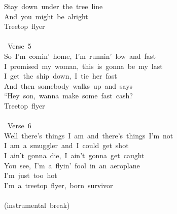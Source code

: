 {Stay\ down\ under\ the\ tree\ line\\
And\ you\ might\ be\ alright\\
Treetop\ flyer\\
\\
\lbrack\ Verse\ 5\rbrack\\
So\ I'm\ comin'\ home,\ I'm\ runnin'\ low\ and\ fast\\
I\ promised\ my\ woman,\ this\ is\ gonna\ be\ my\ last\\
I\ get\ the\ ship\ down,\ I\ tie\ her\ fast\\
And\ then\ somebody\ walks\ up\ and\ says\\
``Hey\ son,\ wanna\ make\ some\ fast\ cash?\;\\
Treetop\ flyer\\
\\
\lbrack\ Verse\ 6\rbrack\\
Well\ there's\ things\ I\ am\ and\ there's\ things\ I'm\ not\\
I\ am\ a\ smuggler\ and\ I\ could\ get\ shot\\
I\ ain't\ gonna\ die,\ I\ ain't\ gonna\ get\ caught\\
You\ see,\ I'm\ a\ flyin'\ fool\ in\ an\ aeroplane\\
I'm\ just\ too\ hot\\
I'm\ a\ treetop\ flyer,\ born\ survivor\\
\\
(instrumental\ break)}

